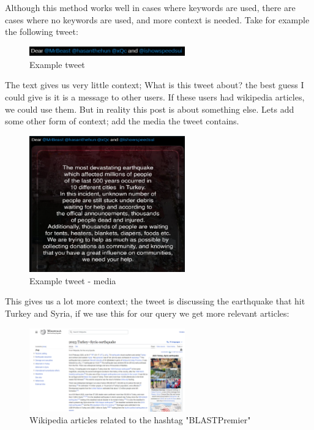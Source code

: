 Although this method works well in cases where keywords are used, there are cases where no keywords are used, and more context
is needed. Take for example the following tweet:
\newpage
\begin{figure}[htbp]
    \centering
    \includegraphics[width=0.6\textwidth]{../images/tweet-example2.png}
    \caption{Example tweet}
    \label{fig:tweet-example}
\end{figure}

The text gives us very little context; What is this tweet about? the best guess I could give
is it is a message to other users. If these users had wikipedia articles, we could use them. But in reality this post is about something else.
Lets add some other form of context; add the media the tweet contains.
\begin{figure}
    \centering
    \includegraphics[width=0.6\textwidth]{../images/tweet-media.png}
    \caption{Example tweet - media}
    \label{fig:tweet-media}
\end{figure}
This gives us a lot more context; the tweet is discussing the earthquake that hit Turkey and Syria, if we use this for our query we get more relevant
articles:
\newpage

\begin{figure}[htbp]
    \centering
    \includegraphics[width=0.6\textwidth]{../images/post-context-example.png}
    \caption{Wikipedia articles related to the hashtag "BLASTPremier"}
    \label{fig:blastpremier}
\end{figure}

